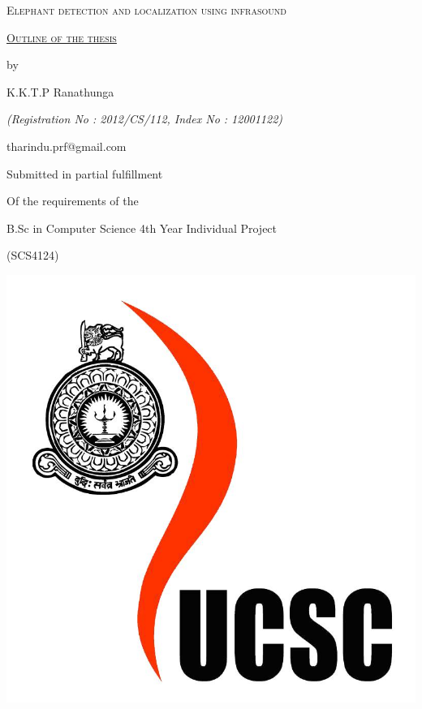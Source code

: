 \documentclass[11pt]{article}
\numberwithin{figure}{section}
\numberwithin{table}{section}
\renewcommand{\baselinestretch}{1.5}
\begin{document}
 

\begin{titlepage}
	
	\centering
	\renewcommand{\baselinestretch}{1.7}\normalsize
	
	{\fontsize{1cm}{1.2em}\selectfont \scshape Elephant detection and localization using infrasound}
	
	\vspace*{2\baselineskip}	
		

	\underline{\fontsize{0.8cm}{1.2em}\selectfont \scshape Outline of the thesis}
	\renewcommand{\baselinestretch}{1.25}\normalsize
	
	\vspace*{2\baselineskip}
	
	{by}
	
	\vspace*{0.3\baselineskip}
	{\Large K.K.T.P Ranathunga}
	\vspace*{0.3\baselineskip}
	
	{\itshape (Registration No : 2012/CS/112, Index No : 12001122)}
	
	{\normalsize tharindu.prf@gmail.com}
	
	\vspace*{2\baselineskip}
	
	\normalsize  {{Submitted in partial fulfillment}
		
		{Of the requirements of the}
		
		{B.Sc in Computer Science 4th Year Individual Project}
		
		{(SCS4124)}}
	
	\vspace*{2\baselineskip}
	
	\includegraphics[scale=0.1]{ucsc.png}
	

\end{titlepage}
\end{document}
